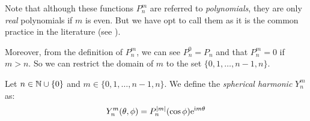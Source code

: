 \documentclass[../main.tex]{subfiles}
\begin{document}
Note that although these functions $P_n^m$ are referred to \emph{polynomials}, they are only \emph{real} polynomials if $m$ is even. But we have opt to call them as it is the common practice in the literature (see \cite{wolfram_associated_legendre_polynomials}).

Moreover, from the definition of $P_n^m$, we can see $P_n^0=P_n$ and that $P_n^m=0$ if $m>n$. So we can restrict the domain of $m$ to the set $\{0,1,\dots,n-1,n\}$.

\begin{definition}
  Let $n\in\mathbb{N}\cup\{0\}$ and $m\in\{0,1,\dots,n-1,n\}$. We define the \emph{spherical harmonic} $Y_n^m$ as:
  \begin{equation}
    Y_n^m(\theta,\phi)=P_n^{\abs{m}}(\cos\phi) \mathrm{e}^{\mathrm{i} m\theta}
  \end{equation}
\end{definition}
\end{document}
